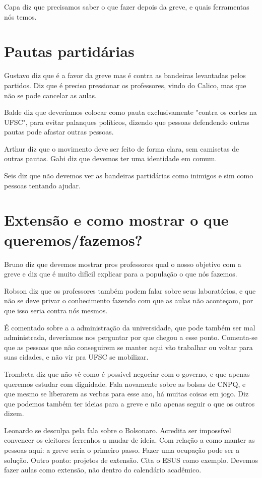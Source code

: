 \documentclass{ata-calico}
\begin{document}
Capa diz que precisamos saber o que fazer depois da greve, e quais ferramentas nós temos. 

\section{Pautas partidárias}
Gustavo diz que é a favor da greve mas é contra as bandeiras levantadas pelos partidos. Diz que é preciso pressionar os professores, vindo do Calico, mas que não se pode cancelar as aulas.

Balde diz que deveríamos colocar como pauta exclusivamente "contra os cortes na UFSC", para evitar palanques políticos, dizendo que pessoas defendendo outras pautas pode afastar outras pessoas. 

Arthur diz que o movimento deve ser feito de forma clara, sem camisetas de outras pautas. Gabi diz que devemos ter uma identidade em comum.  

Seis diz que não devemos ver as bandeiras partidárias como inimigos e sim como pessoas tentando ajudar.

\section{Extensão e como mostrar o que queremos/fazemos?}
Bruno diz que devemos mostrar pros professores qual o nosso objetivo com a greve e diz que é muito difícil explicar para a população o que nós fazemos.


Robson diz que os professores também podem falar sobre seus laboratórios, e que não se deve privar o conhecimento fazendo com que as aulas não aconteçam, por que isso seria contra nós mesmos. 

É comentado sobre a a administração da universidade, que pode também ser mal administrada, deveríamos nos perguntar por que chegou a esse ponto. Comenta-se que as pessoas que não conseguirem se manter aqui vão trabalhar ou voltar para suas cidades, e não vir pra UFSC se mobilizar. 

Trombeta diz que não vê como é possível negociar com o governo, e que apenas queremos estudar com dignidade. Fala novamente sobre as bolsas de CNPQ, e que mesmo se liberarem as verbas para esse ano, há muitas coisas em jogo. Diz que podemos também ter ideias para a greve e não apenas seguir o que os outros dizem.

Leonardo se desculpa pela fala sobre o Bolsonaro. Acredita ser impossível convencer os eleitores ferrenhos a mudar de ideia. Com relação a como manter as pessoas aqui: a greve seria o primeiro passo. Fazer uma ocupação pode ser a solução. Outro ponto: projetos de extensão. Cita o ESUS como exemplo. Devemos fazer aulas como extensão, não dentro do calendário acadêmico.
\end{document}

